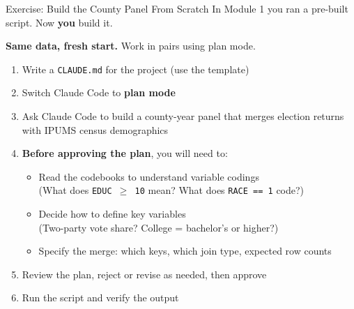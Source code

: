 %


\begin{frame}{Exercise: Build the County Panel From Scratch}
  In Module 1 you ran a pre-built script. Now \textbf{you} build it.

  \vspace{0.3em}
  \textbf{Same data, fresh start.} Work in pairs using plan mode.

  \vspace{0.5em}
  \begin{enumerate}
    \item Write a \texttt{CLAUDE.md} for the project (use the template)
    \item Switch Claude Code to \textbf{plan mode}
    \item Ask Claude Code to build a county-year panel that merges election returns with IPUMS census demographics
    \item \textbf{Before approving the plan}, you will need to:
      \begin{itemize}
        \item Read the codebooks to understand variable codings\\
          {\small (What does \texttt{EDUC $\geq$ 10} mean? What does \texttt{RACE == 1} code?)}
        \item Decide how to define key variables\\
          {\small (Two-party vote share? College = bachelor's or higher?)}
        \item Specify the merge: which keys, which join type, expected row counts
      \end{itemize}
    \item Review the plan, reject or revise as needed, then approve
    \item Run the script and verify the output
  \end{enumerate}
\end{frame}

